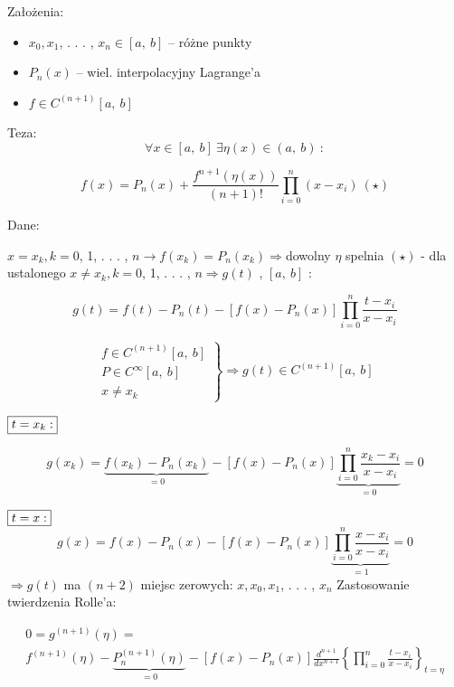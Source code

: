  \begin{frame}

Założenia:

\begin{itemize}
\item $x_{0}, x_{1}$, . . . , $x_{n}\in[a,\ b]$ -- różne punkty
\item $P_{n}(x)$ -- wiel. interpolacyjny Lagrange'a
\item $f\in C^{(n+1)}[a,\ b]$
\end{itemize}

\begin{block}
{Teza:}
$$\forall x\in[a,\ b]\ \exists\eta(x)\in(a,\ b)\ :$$

$$f(x)=P_{n}(x)+\frac{f^{n+1}(\eta(x))}{(n+1)!}\prod_{i=0}^{n}(x-x_{i})\ (\star)$$
\end{block}

\end{frame}

\begin{frame}
Dane:

$x=x_{k}, k=0$, 1, . . . , $n \rightarrow f(x_{k})=P_{n}(x_{k})\Rightarrow$dowolny $\eta$ spelnia $(\star)$ \newline
- dla ustalonego $x\neq x_{k}, k=0$, 1, . . . , $n\Rightarrow g(t)$ , $[a,\ b]$ :

$$g(t)=f(t)-P_{n}(t)-[f(x)-P_{n}(x)]\prod_{i=0}^{n}\frac{t-x_{i}}{x-x_{i}}$$

$$
 \left. \begin{array}{ll}
f\in C^{(n+1)}[a,\ b] \\
P\in C^{\infty}[a,\ b]\\
x\neq x_{k}
\end{array} \right \} \Rightarrow g(t)\in C^{(n+1)}[a,\ b]
$$

$\fbox{$t=x_{k}:$}$

$$g(x_{k})=\underbrace{f(x_{k})-P_{n}(x_{k})}_{=0}-[f(x)-P_{n}(x)]\underbrace{\prod_{i=0}^{n}\frac{x_{k}-x_{i}}{x-x_{i}}}_{=0}=0$$

\end{frame}

\begin{frame}
$\fbox{$t=x:$}$
$$
g(x)=f(x)-P_{n}(x)-[f(x)-P_{n}(x)]\underbrace{\prod_{i=0}^{n}\frac{x-x_{i}}{x-x_{i}}}_{=1}=0
$$
$\Rightarrow g(t)$ ma $(n+2)$ miejsc zerowych: $x, x_{0}, x_{1}$, . . . , $x_{n}$ \newline \newline
Zastosowanie twierdzenia Rolle'a:


$$\begin{array}{ll}
0=g^{(n+1)}(\displaystyle \eta)= \\
f^{(n+1)}(\eta)-\underbrace{P_{n}^{(n+1)}(\eta)}_{=0}-[f(x)-P_{n}(x)]\frac{d^{n+1}}{dx^{n+1}} \left \{\prod_{i=0}^{n}\frac{t-x_{i}}{x-x_{i}} \right \}_{t=\eta}  \end{array}$$


 \end{frame}

